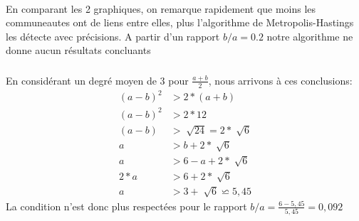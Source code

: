 \paragraph*{}
En comparant les 2 graphiques, on remarque rapidement que moins les communeautes
ont de liens entre elles, plus l'algorithme de Metropolis-Hastings les détecte avec 
précisions. A partir d'un rapport $b/a = 0.2 $ notre algorithme ne donne aucun
résultats concluants

\subsubsection{}
\paragraph*{}
En considérant un degré moyen de 3 pour $\frac{a+b}{2}$, nous arrivons à ces conclusions:
\begin{align*}
    (a-b)^2 &> 2*(a+b)\\
    (a-b)^2 &> 2*12\\
    (a-b)&>\sqrt[]{24}=2*\sqrt[]{6}\\
    a&>b+2*\sqrt[]{6}\\
    a&>6-a+2*\sqrt[]{6}\\
    2*a&>6+2*\sqrt[]{6}\\
    a&>3+\sqrt[]{6}\backsimeq 5,45
\end{align*}
La condition n'est donc plus respectées pour le rapport $b/a = \frac{6-5,45}{5,45}= 0,092$